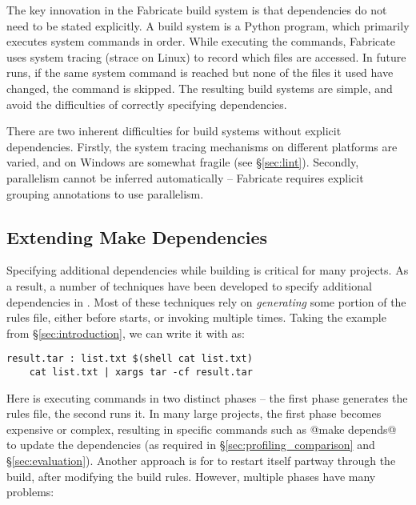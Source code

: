 
The key innovation in the Fabricate build system \cite{fabricate} is that dependencies do not need to be stated explicitly. A build system is a Python program, which primarily executes system commands in order. While executing the commands, Fabricate uses system tracing (strace on Linux) to record which files are accessed. In future runs, if the same system command is reached but none of the files it used have changed, the command is skipped. The resulting build systems are simple, and avoid the difficulties of correctly specifying dependencies.

There are two inherent difficulties for build systems without explicit dependencies. Firstly, the system tracing mechanisms on different platforms are varied, and on Windows are somewhat fragile (see \S\ref{sec:lint}). Secondly, parallelism cannot be inferred automatically -- Fabricate requires explicit grouping annotations to use parallelism.

\subsection{Extending Make Dependencies}
\label{sec:make_hacks}

Specifying additional dependencies while building is critical for many projects. As a result, a number of techniques have been developed to specify additional dependencies in \make{}. Most of these techniques rely on \textit{generating} some portion of the \make{} rules file, either before \make{} starts, or invoking \make{} multiple times. Taking the example from \S\ref{sec:introduction}, we can write it with \make{} as:

\begin{verbatim}
result.tar : list.txt $(shell cat list.txt)
    cat list.txt | xargs tar -cf result.tar
\end{verbatim}

Here \make{} is executing commands in two distinct phases -- the first phase generates the rules file, the second runs it. In many large projects, the first phase becomes expensive or complex, resulting in specific commands such as @make depends@ to update the dependencies (as required in \S\ref{sec:profiling_comparison} and \S\ref{sec:evaluation}). Another approach is for \make{} to restart itself partway through the build, after modifying the build rules. However, multiple phases have many problems:

